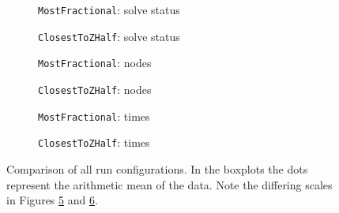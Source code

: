 \begin{figure}
	\centering

	\begin{subfigure}{0.495\textwidth}
		\centering
		
		\caption{\texttt{MostFractional}: solve status}
		\label{fig:mostfractional_solve_status}
	\end{subfigure}
	\hfill
	\begin{subfigure}{0.495\textwidth}
		\centering
		
		\caption{\texttt{ClosestToZHalf}: solve status}
		\label{fig:closesttozhalf_solve_status}
	\end{subfigure}

	\vspace{1em}

	\begin{subfigure}{0.495\textwidth}
		\centering
		
		\caption{\texttt{MostFractional}: nodes}
		\label{fig:mostfractional_nodes}
	\end{subfigure}
	\hfill
	\begin{subfigure}{0.495\textwidth}
		\centering
		
		\caption{\texttt{ClosestToZHalf}: nodes}
		\label{fig:closesttozhalf_nodes}
	\end{subfigure}

	\vspace{1em}

	\begin{subfigure}{0.495\textwidth}
		\centering
		
		\caption{\texttt{MostFractional}: times}
		\label{fig:mostfractional_times}
	\end{subfigure}
	\hfill
	\begin{subfigure}{0.495\textwidth}
		\centering
		
		\caption{\texttt{ClosestToZHalf}: times}
		\label{fig:closesttozhalf_times}
	\end{subfigure}

	\caption{Comparison of all run configurations. In the boxplots the dots represent the arithmetic mean of the data. Note the differing scales in Figures \ref{fig:mostfractional_times} and \ref{fig:closesttozhalf_times}.}
	\label{fig:comparison_general}
\end{figure}

